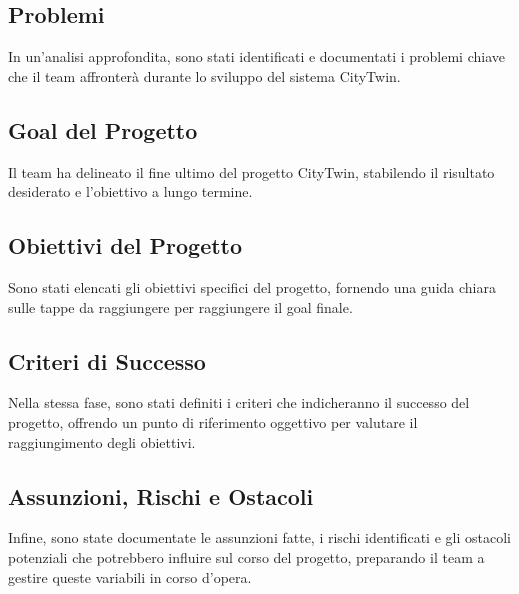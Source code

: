 \subsection{Problemi}

In un'analisi approfondita, sono stati identificati e documentati i problemi chiave che il team affronterà durante lo sviluppo del sistema CityTwin.

\subsection{Goal del Progetto}

Il team ha delineato il fine ultimo del progetto CityTwin, stabilendo il risultato desiderato e l'obiettivo a lungo termine.

\subsection{Obiettivi del Progetto}

Sono stati elencati gli obiettivi specifici del progetto, fornendo una guida chiara sulle tappe da raggiungere per raggiungere il goal finale.

\subsection{Criteri di Successo}

Nella stessa fase, sono stati definiti i criteri che indicheranno il successo del progetto, offrendo un punto di riferimento oggettivo per valutare il raggiungimento degli obiettivi.

\subsection{Assunzioni, Rischi e Ostacoli}

Infine, sono state documentate le assunzioni fatte, i rischi identificati e gli ostacoli potenziali che potrebbero influire sul corso del progetto, preparando il team a gestire queste variabili in corso d'opera.
